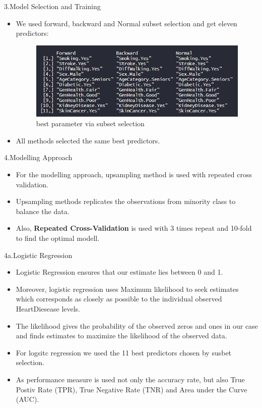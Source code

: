 \documentclass[xcolor=dvipsnames]{beamer}
\begin{document}
\begin{frame}{3.Model Selection and Training}
\begin{itemize}
\item We used forward, backward and Normal subset selection and get eleven predictors:
\begin{figure}
    \centering
    \includegraphics[scale= 0.5]{bestSubset.png}
    \caption{best parameter via subset selection}
    \label{fig:my_label}
\end{figure}
\item All methods selected the same best predictors.
\end{itemize}
\end{frame}

\begin{frame}{4.Modelling Approach}
\begin{itemize}
\item For the  modelling approach, upsampling method is used with  repeated cross validation. 
\item Upsampling methods replicates the observations from minority class to balance the data.
\item  Also, \textbf{Repeated Cross-Validation} is used with  3 times repeat and 10-fold to find the optimal modell.
\end{itemize}
\end{frame}

\begin{frame}{4a.Logistic Regression}
\begin{itemize}
\item Logistic Regression ensures that our estimate lies between 0 and 1.
\item Moreover, logistic regression uses Maximum likelihood to seek estimates which corresponds as closely as possible to the
individual observed HeartDiesease levels.
\item  The likelihood gives the probability of the observed
zeros and ones in our case and finds estimates to maximize the likelihood of the observed data.
\item For logsitc regression we used the 11 best predictors chosen by susbet selection. 
\item As performance measure is used not only the accuracy rate, but also True Postiv Rate (TPR), True Negative Rate (TNR) and Area under the Curve (AUC).
\end{itemize}
\end{frame}
\end{document}
